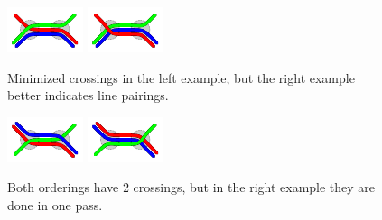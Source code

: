 \documentclass[sigconf]{acmart}
\begin{document}
\begin{figure}[t]
\centering
\begin{minipage}{.465\textwidth}
  \centering
  \includegraphics[trim={2.25 2.2 2.25 2.2},clip,width=.39\textwidth]{render_examples/splitting_example_nonopt.pdf}\hspace{28pt}
  \includegraphics[trim={2.25 2.2 2.25 2.2},clip,width=.39\textwidth]{render_examples/splitting_example.pdf}
  \caption{Minimized crossings in the left example, but the right example better indicates line pairings.}
  \label{FIG:linesplitting}
\end{minipage}%
\hfill
\begin{minipage}{.476\textwidth}
  \centering
  \includegraphics[trim={2.25 2.2 2.25 2.2},clip,width=.38\textwidth]{render_examples/splitting_example2_nonopt.pdf}\hspace{28pt}
  \includegraphics[trim={2.25 2.2 2.25 2.2},clip,width=.38\textwidth]{render_examples/splitting_example2.pdf}
  \caption{Both orderings have 2 crossings, but in the right example they are done in one pass.}
  \label{FIG:linesplitting2}
\end{minipage}
\end{figure}
\end{document}
